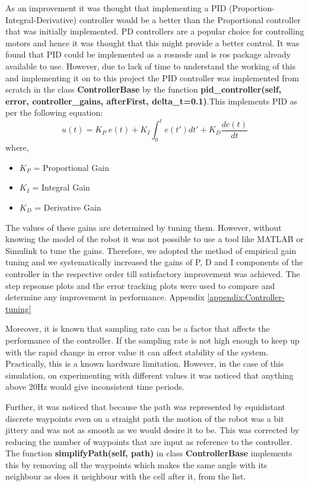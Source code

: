 \documentclass[a4paper,12pt]{article}
\begin{document}
		As an improvement it was thought that implementing a PID (Proportion-Integral-Derivative) controller would be a better than the Proportional controller that was initially implemented. PD controllers are a popular choice for controlling motors and hence it was thought that this might provide a better control. It was found that PID could be implemented as a rosnode and is ros package already available to use. However, due to lack of time to understand the working of this and implementing it on to this project the PID controller was implemented from scratch in the class \textbf{ControllerBase} by the function \textbf{pid\_controller(self, error, controller\_gains, afterFirst, delta\_t=0.1)}.This implements PID as per the following equation:
		\begin{equation}
			u(t)=K_P \; e(t) + K_I \int_{0}^{t}e(t')dt'+K_D \frac{de(t)}{dt}
		\end{equation}
		where,
		\begin{itemize}
			\item $K_P$ = Proportional Gain
			\item $K_I$ = Integral Gain
			\item $K_D$ = Derivative Gain
		\end{itemize}
	The values of these gains are determined by tuning them. However, without knowing the model of the robot it was not possible to use a tool like MATLAB or Simulink to tune the gains. Therefore, we adopted the method of empirical gain tuning and we systematically increased the gains of P, D and I components of the controller in the respective order till satisfactory improvement was achieved. The step repsonse plots and the error tracking plots were used to compare and determine any improvement in performance. Appendix \ref{appendix:Controller-tuning}
	
		Moreover, it is known that sampling rate can be a factor that affects the performance of the controller. If the sampling rate is not high enough to keep up with the rapid change in error value it can affect stability of the system. Practically, this is a known hardware limitation. However, in the case of this simulation, on experimenting with different values it was noticed that anything above 20Hz would give inconsistent time periods. 
		
		Further, it was noticed that because the path was represented by equidistant discrete waypoints even on a straight path the motion of the robot was a bit jittery and was not as smooth as we would desire it to be. This was corrected by reducing the number of waypoints that are input as reference to the controller. The function \textbf{simplifyPath(self, path)} in class \textbf{ControllerBase} implements this by removing all the waypoints which makes the same angle with its neighbour as does it neighbour with the cell after it, from the list.
	
\end{document}
